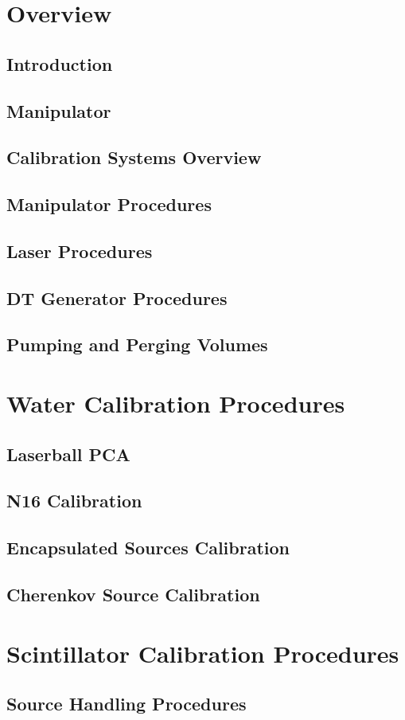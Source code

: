 \documentclass[10pt]{report}
\begin{document}
\part{Overview}
\chapter{Introduction}

\chapter{Manipulator}

\chapter{Calibration Systems Overview}




\chapter{Manipulator Procedures}

\chapter{Laser Procedures}

\chapter{DT Generator Procedures}


\chapter{Pumping and Perging Volumes}
\part{Water Calibration Procedures}
\chapter{Laserball PCA}

\chapter{N16 Calibration}

\chapter{Encapsulated Sources Calibration}

\chapter{Cherenkov Source Calibration}


\part{Scintillator Calibration Procedures}
\chapter{Source Handling Procedures}


\end{document}
